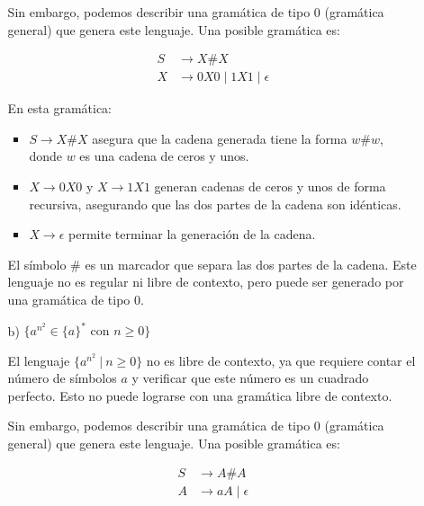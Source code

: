 \documentclass[12pt]{report} %
\begin{document}
\begin{ejercicio}
\begin{itemize}
\begin{itemize}
\begin{solucion}
        Sin embargo, podemos describir una gramática de tipo 0 (gramática general) que genera este lenguaje. Una posible gramática es:

        \begin{align*}
        S &\to X \# X \\
        X &\to 0X0 \mid 1X1 \mid \epsilon
        \end{align*}

        En esta gramática:
        \begin{itemize}
            \item $S \to X \# X$ asegura que la cadena generada tiene la forma $w \# w$, donde $w$ es una cadena de ceros y unos.
            \item $X \to 0X0$ y $X \to 1X1$ generan cadenas de ceros y unos de forma recursiva, asegurando que las dos partes de la cadena son idénticas.
            \item $X \to \epsilon$ permite terminar la generación de la cadena.
        \end{itemize}

        El símbolo $\#$ es un marcador que separa las dos partes de la cadena. Este lenguaje no es regular ni libre de contexto, pero puede ser generado por una gramática de tipo 0.

        \end{solucion}

        

        

        



        \item[b)] $\{a^{n^2} \in \{a\}^* \text{ con } n \geq 0\}$

        \begin{solucion}

        El lenguaje $\{a^{n^2} \ | \ n \geq 0\}$ no es libre de contexto, ya que requiere contar el número de símbolos $a$ y verificar que este número es un cuadrado perfecto. Esto no puede lograrse con una gramática libre de contexto.

        Sin embargo, podemos describir una gramática de tipo 0 (gramática general) que genera este lenguaje. Una posible gramática es:

        \begin{align*}
        S &\to A \# A \\
        A &\to aA \mid \epsilon
        \end{align*}


\end{solucion}
\end{itemize}
\end{itemize}
\end{ejercicio}
\end{document}
